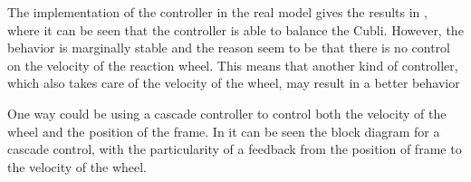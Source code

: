 The implementation of the controller in the real model gives the results in , where it can be seen that the controller is able to balance the Cubli. However, the behavior is marginally stable and the reason seem to be that there is no control on the velocity of the reaction wheel. This means that another kind of controller, which also takes care of the velocity of the wheel, may result in a better behavior
%


One way could be using a cascade controller to control both the velocity of the wheel and the position of the frame. In  it can be seen the block diagram for a cascade control, with the particularity of a feedback from the position of frame to the velocity of the wheel.

